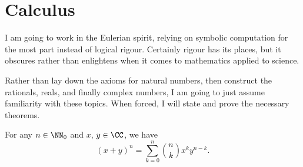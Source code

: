 
\chapter{Calculus}


\begin{node}\label{calculus-0000}%
I am going to work in the Eulerian spirit, relying on symbolic
computation for the most part instead of logical rigour. Certainly
rigour has its places, but it obscures rather than enlightens when it
comes to mathematics applied to science.

Rather than lay down the axioms for natural numbers, then construct the
rationals, reals, and finally complex numbers, I am going to just assume
familiarity with these topics. When forced, I will state and prove the
necessary theorems.
\end{node}

\begin{theorem}[Binomial]\label{calculus-000B}%
For any $n\in\NN_{0}$ and $x$, $y\in\CC$, we have
\[(x+y)^{n} = \sum^{n}_{k=0}\binom{n}{k}x^{k}y^{n-k}.\]
\end{theorem}

